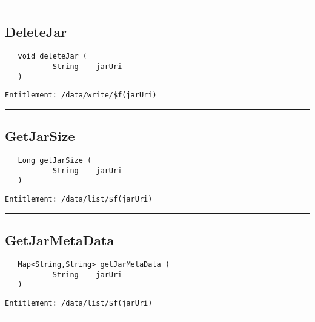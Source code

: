 \rule{12cm}{2pt}
\subsection{DeleteJar}
\label{Api:DeleteJar}
\begin{Verbatim}
   void deleteJar (
           String    jarUri
   )
\end{Verbatim}
\begin{Verbatim}[formatcom=\color{Maroon}]
  Entitlement: /data/write/$f(jarUri)
\end{Verbatim}



\rule{12cm}{2pt}
\subsection{GetJarSize}
\label{Api:GetJarSize}
\begin{Verbatim}
   Long getJarSize (
           String    jarUri
   )
\end{Verbatim}
\begin{Verbatim}[formatcom=\color{Maroon}]
  Entitlement: /data/list/$f(jarUri)
\end{Verbatim}



\rule{12cm}{2pt}
\subsection{GetJarMetaData}
\label{Api:GetJarMetaData}
\begin{Verbatim}
   Map<String,String> getJarMetaData (
           String    jarUri
   )
\end{Verbatim}
\begin{Verbatim}[formatcom=\color{Maroon}]
  Entitlement: /data/list/$f(jarUri)
\end{Verbatim}



\rule{12cm}{2pt}
